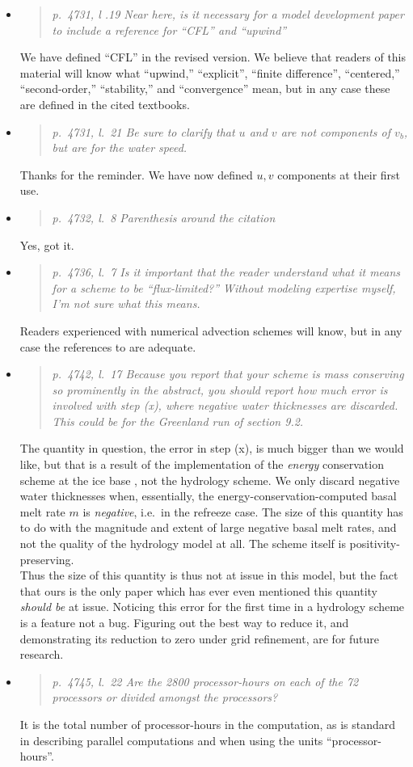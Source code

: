\documentclass[11pt,reqno]{amsart}
\newcommand{\reply}[2]{
\medskip\medskip
\item  \begin{quote}
\emph{#1}
\end{quote}

\medskip
\noindent #2}
\begin{document}
\begin{itemize}
\reply{p.~4731, l .19 Near here, is it necessary for a model development paper to include a
reference for ``CFL'' and ``upwind''}
{We have defined ``CFL'' in the revised version.  We believe that readers of this material will know what ``upwind,'' ``explicit'', ``finite difference'', ``centered,'' ``second-order,'' ``stability,'' and ``convergence'' mean, but in any case these are defined in the cited textbooks.}

\reply{p.~4731, l.~21 Be sure to clarify that $u$ and $v$ are not components of $v_b$, but are for the water speed.}
{Thanks for the reminder.  We have now defined $u,v$ components at their first use.}

\reply{p.~4732, l.~8 Parenthesis around the citation}
{Yes, got it.}

\reply{p.~4736, l.~7 Is it important that the reader understand what it means for a scheme to be ``flux-limited?''  Without modeling expertise myself, I’m not sure what this means.}
{Readers experienced with numerical advection schemes will know, but in any case the references to \cite{HundsdorferVerwer2010,LeVeque,MortonMayers} are adequate.}

\reply{p.~4742, l.~17 Because you report that your scheme is mass conserving so prominently
in the abstract, you should report how much error is involved with step (x), where
negative water thicknesses are discarded. This could be for the Greenland run of
section 9.2.}
{The quantity in question, the error in step (x), is much bigger than we would like, but that is a result of the implementation of the \emph{energy} conservation scheme at the ice base \cite{AschwandenBuelerKhroulevBlatter}, not the hydrology scheme.  We only discard negative water thicknesses when, essentially, the energy-conservation-computed basal melt rate $m$ is \emph{negative}, i.e.~in the refreeze case.  The size of this quantity has to do with the magnitude and extent of large negative basal melt rates, and not the quality of the hydrology model at all.  The scheme itself is positivity-preserving. \\
\indent Thus the size of this quantity is thus not at issue in this model, but the fact that ours is the only paper which has ever even mentioned this quantity \emph{should be} at issue.  Noticing this error for the first time in a hydrology scheme is a feature not a bug.  Figuring out the best way to reduce it, and demonstrating its reduction to zero under grid refinement, are for future research.}

\reply{p.~4745, l.~22 Are the 2800 processor-hours on each of the 72 processors or divided amongst the processors?}
{It is the total number of processor-hours in the computation, as is standard in describing parallel computations and when using the units ``processor-hours''.}


\end{itemize}
\end{document}
